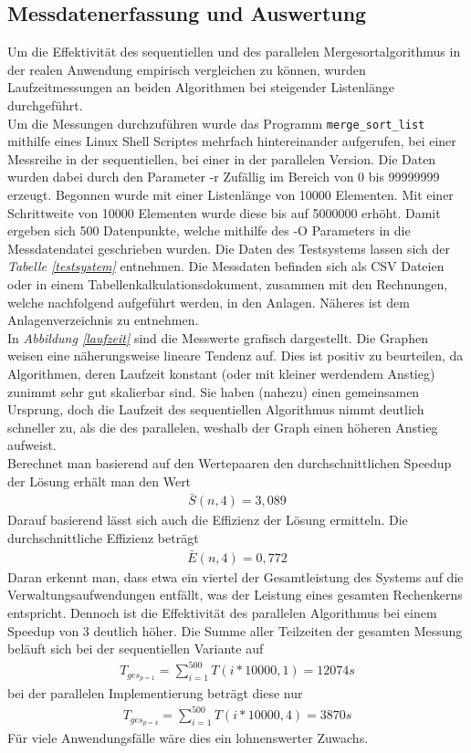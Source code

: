 \subsection{Messdatenerfassung und Auswertung}
Um die Effektivität des sequentiellen und des parallelen Mergesortalgorithmus in der realen Anwendung empirisch vergleichen zu können, wurden Laufzeitmessungen an beiden Algorithmen bei steigender Listenlänge durchgeführt.\\[0.25 cm]
Um die Messungen durchzuführen wurde das Programm \texttt{merge\_sort\_list} mithilfe eines Linux Shell Scriptes mehrfach hintereinander aufgerufen, bei einer Messreihe in der sequentiellen, bei einer in der parallelen Version. Die Daten wurden dabei durch den Parameter -r Zufällig im Bereich von 0 bis 99999999 erzeugt. Begonnen wurde mit einer Listenlänge von 10000 Elementen. Mit einer Schrittweite von 10000 Elementen wurde diese bis auf 5000000 erhöht. Damit ergeben sich 500 Datenpunkte, welche mithilfe des -O Parameters in die Messdatendatei geschrieben wurden. Die Daten des Testsystems lassen sich der \textit{Tabelle \ref{testsystem}} entnehmen. Die Messdaten befinden sich als \ac{CSV} Dateien oder in einem Tabellenkalkulationsdokument, zusammen mit den Rechnungen, welche nachfolgend aufgeführt werden, in den Anlagen. Näheres ist dem Anlagenverzeichnis zu entnehmen.\\[0.25 cm]
In \textit{Abbildung \ref{laufzeit}} sind die Messwerte grafisch dargestellt. Die Graphen weisen eine näherungsweise lineare Tendenz auf. Dies ist positiv zu beurteilen, da Algorithmen, deren Laufzeit konstant (oder mit kleiner werdendem Anstieg) zunimmt sehr gut skalierbar sind.  Sie haben (nahezu) einen gemeinsamen Ursprung, doch die Laufzeit des sequentiellen Algorithmus nimmt deutlich schneller zu, als die des parallelen, weshalb der Graph einen höheren Anstieg aufweist.\\
Berechnet man basierend auf den Wertepaaren den durchschnittlichen Speedup der Lösung erhält man den Wert
\begin{align}
\bar{S}(n,4)=3,089
\end{align}
Darauf basierend lässt sich auch die Effizienz der Lösung ermitteln. Die durchschnittliche Effizienz beträgt
\begin{align}
\bar{E}(n,4)=0,772
\end{align}
Daran erkennt man, dass etwa ein viertel der Gesamtleistung des Systems auf die Verwaltungsaufwendungen entfällt, was der Leistung eines gesamten Rechenkerns entspricht. Dennoch ist die Effektivität des parallelen Algorithmus bei einem Speedup von 3 deutlich höher. Die Summe aller Teilzeiten der gesamten Messung beläuft sich bei der sequentiellen Variante auf
\begin{align}
T_{ges_{p=1}}=\sum_{i=1}^{500} T(i*10000,1)=12074s
\end{align}
bei der parallelen Implementierung beträgt diese nur
\begin{align}
T_{ges_{p=4}}=\sum_{i=1}^{500} T(i*10000,4)=3870s
\end{align}
Für viele Anwendungsfälle wäre dies ein lohnenswerter Zuwachs.

